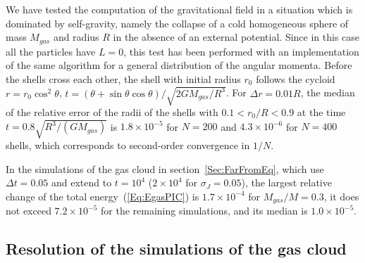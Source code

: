 We have tested the computation of the gravitational field in a situation which is dominated by self-gravity, namely the collapse of a cold homogeneous sphere of mass $M_{gas}$ and radius $R$ in the absence of an external potential. Since in this case all the particles have $L = 0$, this test has been performed with an implementation of the same algorithm for a general distribution of the angular momenta. Before the shells cross each other, the shell with initial radius $r_0$ follows the cycloid $r = r_0\cos^2\theta$, $t = (\theta + \sin\theta\cos\theta)/\sqrt{2GM_{gas}/R^3}$. For $\Delta r = 0.01 R$, the median of the relative error of the radii of the shells with $0.1 < r_0/R < 0.9$ at the time $t = 0.8\sqrt{R^3/(GM_{gas})}$ is $1.8\times 10^{-5}$ for $N = 200$ and $4.3\times 10^{-6}$ for $N = 400$ shells, which corresponds to second-order convergence in $1/N$.

In the simulations of the gas cloud in section~\ref{Sec:FarFromEq}, which use $\Delta t = 0.05$ and extend to $t = 10^4$ ($2\times 10^4$ for $\sigma_J = 0.05$), the largest relative change of the total energy~(\ref{Eq:EgasPIC}) is $1.7\times 10^{-4}$ for $M_{gas}/M = 0.3$, it does not exceed $7.2\times 10^{-5}$ for the remaining simulations, and its median is $1.0\times 10^{-5}$. 


\subsection{Resolution of the simulations of the gas cloud}
\label{SubSec:ValResolution}

